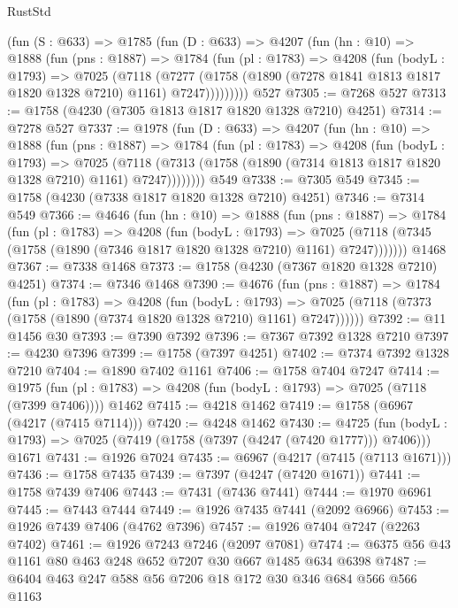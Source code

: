 \begin{lexlean}{RustStd}
\begin{coremodule}
{\begin{coremodule}
{{{{{{{{{{{{{{{    (fun (S : @633) =>
    @1785
      (fun (D : @633) =>
      @4207
        (fun (hn : @10) =>
        @1888
          (fun (pns : @1887) =>
          @1784
            (fun (pl : @1783) =>
            @4208
              (fun (bodyL : @1793) =>
              @7025
                (@7118
                  (@7277
                    (@1758 (@1890 (@7278 @1841 @1813 @1817 @1820 @1328 @7210) @1161) @7247)))))))))
    @527
@7305 := @7268 @527
@7313 := @1758 (@4230 (@7305 @1813 @1817 @1820 @1328 @7210) @4251)
@7314 := @7278 @527
@7337 := @1978
    (fun (D : @633) =>
    @4207
      (fun (hn : @10) =>
      @1888
        (fun (pns : @1887) =>
        @1784
          (fun (pl : @1783) =>
          @4208
            (fun (bodyL : @1793) =>
            @7025
              (@7118 (@7313 (@1758 (@1890 (@7314 @1813 @1817 @1820 @1328 @7210) @1161) @7247))))))))
    @549
@7338 := @7305 @549
@7345 := @1758 (@4230 (@7338 @1817 @1820 @1328 @7210) @4251)
@7346 := @7314 @549
@7366 := @4646
    (fun (hn : @10) =>
    @1888
      (fun (pns : @1887) =>
      @1784
        (fun (pl : @1783) =>
        @4208
          (fun (bodyL : @1793) =>
          @7025 (@7118 (@7345 (@1758 (@1890 (@7346 @1817 @1820 @1328 @7210) @1161) @7247)))))))
    @1468
@7367 := @7338 @1468
@7373 := @1758 (@4230 (@7367 @1820 @1328 @7210) @4251)
@7374 := @7346 @1468
@7390 := @4676
    (fun (pns : @1887) =>
    @1784
      (fun (pl : @1783) =>
      @4208
        (fun (bodyL : @1793) =>
        @7025 (@7118 (@7373 (@1758 (@1890 (@7374 @1820 @1328 @7210) @1161) @7247))))))
@7392 := @11 @1456 @30
@7393 := @7390 @7392
@7396 := @7367 @7392 @1328 @7210
@7397 := @4230 @7396
@7399 := @1758 (@7397 @4251)
@7402 := @7374 @7392 @1328 @7210
@7404 := @1890 @7402 @1161
@7406 := @1758 @7404 @7247
@7414 := @1975
    (fun (pl : @1783) => @4208 (fun (bodyL : @1793) => @7025 (@7118 (@7399 @7406))))
    @1462
@7415 := @4218 @1462
@7419 := @1758 (@6967 (@4217 (@7415 @7114)))
@7420 := @4248 @1462
@7430 := @4725
    (fun (bodyL : @1793) => @7025 (@7419 (@1758 (@7397 (@4247 (@7420 @1777))) @7406)))
    @1671
@7431 := @1926 @7024
@7435 := @6967 (@4217 (@7415 (@7113 @1671)))
@7436 := @1758 @7435
@7439 := @7397 (@4247 (@7420 @1671))
@7441 := @1758 @7439 @7406
@7443 := @7431 (@7436 @7441)
@7444 := @1970 @6961
@7445 := @7443 @7444
@7449 := @1926 @7435 @7441 (@2092 @6966)
@7453 := @1926 @7439 @7406 (@4762 @7396)
@7457 := @1926 @7404 @7247 (@2263 @7402)
@7461 := @1926 @7243 @7246 (@2097 @7081)
@7474 := @6375 @56 @43 @1161 @80 @463 @248 @652 @7207 @30 @667 @1485 @634 @6398
@7487 := @6404 @463 @247 @588 @56 @7206 @18 @172 @30 @346 @684 @566 @566 @1163
}}}}}}}}}}}}}}}
\end{coremodule}}
\end{coremodule}
\end{lexlean}
